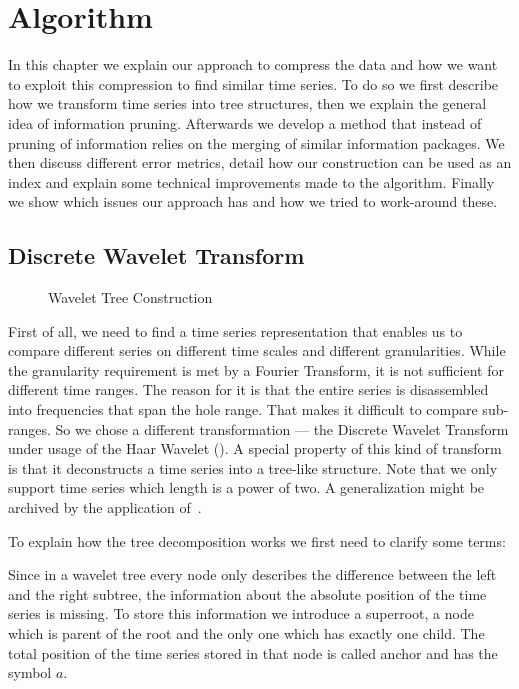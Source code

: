 \chapter{Algorithm}
\label{ch:algorithm}

In this chapter we explain our approach to compress the data and how we want to exploit this compression to find similar time series. To do so we first describe how we transform time series into tree structures, then we explain the general idea of information pruning. Afterwards we develop a method that instead of pruning of information relies on the merging of similar information packages. We then discuss different error metrics, detail how our construction can be used as an index and explain some technical improvements made to the algorithm. Finally we show which issues our approach has and how we tried to work-around these.



\section{Discrete Wavelet Transform}
\label{sec:algorithm:wavelet}

\begin{figure}
    \centering
    
    \caption{Wavelet Tree Construction}\label{fig:wavelet_tree_example}
\end{figure}

First of all, we need to find a time series representation that enables us to compare different series on different time scales and different granularities. While the granularity requirement is met by a Fourier Transform, it is not sufficient for different time ranges. The reason for it is that the entire series is disassembled into frequencies that span the hole range. That makes it difficult to compare sub-ranges. So we chose a different transformation --- the Discrete Wavelet Transform under usage of the Haar Wavelet (\cite{Haar}). A special property of this kind of transform is that it deconstructs a time series into a tree-like structure. Note that we only support time series which length is a power of two. A generalization might be archived by the application of~\cite{haar_tree_notwo}.

To explain how the tree decomposition works we first need to clarify some terms:

\begin{definition}[Superroot]
    Since in a wavelet tree every node only describes the difference between the left and the right subtree, the information about the absolute position of the time series is missing. To store this information we introduce a superroot, a node which is parent of the root and the only one which has exactly one child. The total position of the time series stored in that node is called anchor and has the symbol $a$.
\end{definition}

